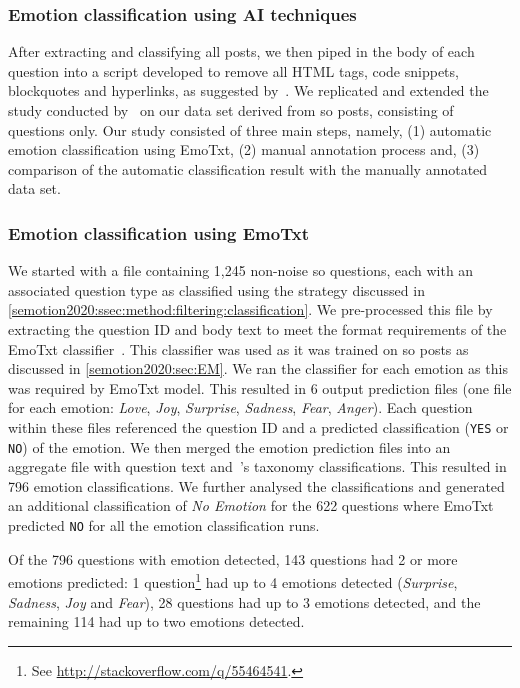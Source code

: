 \subsubsection{Emotion classification using AI techniques}

After extracting and classifying all posts, we then piped in the body of each question into a script developed to remove all HTML tags, code snippets, blockquotes and hyperlinks, as suggested by~\citet{novielli2018}. We replicated and extended the study conducted by~\citet{novielli2018} on our data set derived from \SEMNumPostsFromSO{} \gls{so} posts, consisting of questions only. Our study consisted of three main steps, namely, (1) automatic emotion classification using EmoTxt, (2) manual annotation process and, (3) comparison of the automatic classification result with the manually annotated data set.

\subsubsection{Emotion classification using EmoTxt}
We started with a file containing 1,245 non-noise \gls{so} questions, each with an associated question type as classified using the strategy discussed in \cref{semotion2020:ssec:method:filtering:classification}. We pre-processed this file by extracting the question ID and body text to meet the format requirements of the EmoTxt classifier~\citep{calefato2017}. This classifier was used as it was trained on \gls{so} posts as discussed in \cref{semotion2020:sec:EM}. We ran the classifier for each emotion as this was required by EmoTxt model.  This resulted in 6 output prediction files (one file for each emotion: \textit{Love}, \textit{Joy}, \textit{Surprise}, \textit{Sadness}, \textit{Fear}, \textit{Anger}). Each question within these files referenced the question ID and a predicted classification (\texttt{YES} or \texttt{NO}) of the emotion.  We then merged the emotion prediction files into an aggregate file with question text and~\citeauthor{Beyer:2018fm}'s taxonomy classifications. This resulted in 796 emotion classifications. We further analysed the classifications and generated an additional classification of \textit{No Emotion} for the 622 questions where EmoTxt predicted \texttt{NO} for all the emotion classification runs.

Of the 796 questions with emotion detected, 143 questions had 2 or more emotions predicted: 1 question\footnote{See \url{http://stackoverflow.com/q/55464541}.} had up to 4 emotions detected (\textit{Surprise}, \textit{Sadness}, \textit{Joy} and \textit{Fear}), 28 questions had up to 3 emotions detected, and the remaining 114 had up to two emotions detected.

